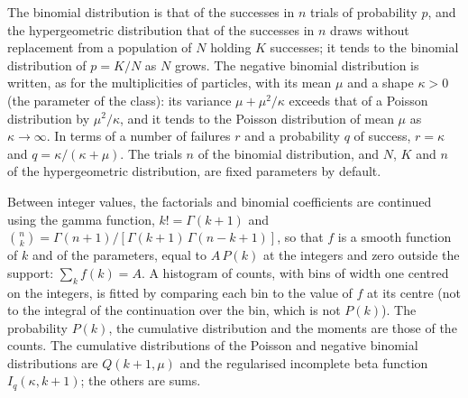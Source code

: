 The binomial distribution is that of the successes in $n$ trials of probability $p$, and the hypergeometric
distribution that of the successes in $n$ draws without replacement from a population of $N$ holding $K$ successes; it tends to the binomial distribution of $p = K/N$ as $N$ grows. The negative binomial distribution is written, as for the multiplicities of particles, with its mean $\mu$ and a shape $\kappa > 0$ (the parameter  of the class): its variance $\mu + \mu^2/\kappa$ exceeds that of a Poisson distribution by $\mu^2/\kappa$, and it tends to the Poisson distribution of mean $\mu$ as $\kappa \to \infty$. In terms of a number of failures $r$ and a probability $q$
of success, $r = \kappa$ and $q = \kappa/(\kappa + \mu)$. The trials $n$ of the binomial distribution, and $N$, $K$ and $n$ of the hypergeometric distribution, are fixed parameters by default.

Between  integer values, the factorials and binomial coefficients are continued using the gamma function,
$k! = \Gamma(k+1)$ and $\binom{n}{k} = \Gamma(n+1)/[\Gamma(k+1)\,\Gamma(n-k+1)]$, so that $f$ is a smooth function of $k$ and of the parameters, equal to $A\,P(k)$ at the integers and zero outside the support: $\sum_k f(k) = A$. A histogram of counts, with bins of width one centred on the integers, is fitted by comparing each bin to the value of $f$ at its centre (not to the integral of the continuation over the bin, which is not $P(k)$). The probability $P(k)$, the cumulative distribution and the moments are those of the counts. The cumulative distributions of the Poisson and negative binomial distributions are $Q(k+1, \mu)$ and the regularised incomplete beta function $I_q(\kappa, k+1)$; the others are sums.

